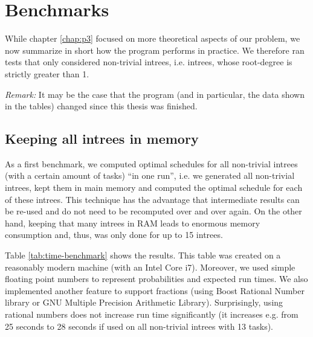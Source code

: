 \chapter{Benchmarks}
\label{chap:benchmarks}

While chapter \ref{chap:p3} focused on more theoretical aspects of our problem, we now summarize in short how the program performs in practice. We therefore ran tests that only considered non-trivial intrees, i.e. intrees, whose root-degree is strictly greater than 1.

\emph{Remark:} It may be the case that the program (and in particular, the data shown in the tables) changed since this thesis was finished.


\section{Keeping all intrees in memory}
\label{sec:benchmarks-all-intrees-in-memory}

As a first benchmark, we computed optimal schedules for all non-trivial intrees (with a certain amount of tasks) ``in one run'', i.e. we generated all non-trivial intrees, kept them in main memory and computed the optimal schedule for each of these intrees. This technique has the advantage that intermediate results can be re-used and do not need to be recomputed over and over again. On the other hand, keeping that many intrees in RAM leads to enormous memory consumption and, thus, was only done for up to 15 intrees.

Table \ref{tab:time-benchmark} shows the results. This table was created on a reasonably modern machine (with an Intel Core i7). Moreover, we used simple floating point numbers to represent probabilities and expected run times. We also implemented another feature to support fractions (using Boost Rational Number library or GNU Multiple Precision Arithmetic Library). Surprisingly, using rational numbers does not increase run time significantly (it increases e.g. from 25 seconds to 28 seconds if used on all non-trivial intrees with 13 tasks).

